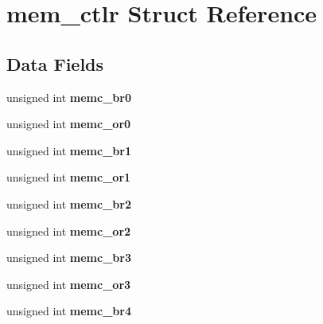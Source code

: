 \hypertarget{structmem__ctlr}{}\section{mem\+\_\+ctlr Struct Reference}
\label{structmem__ctlr}
\subsection*{Data Fields}
\begin{DoxyCompactItemize}
\item 
\mbox{\label{structmem__ctlr_a632d401a3594cf9f50c20b359645c109}} 
unsigned int {\bfseries memc\+\_\+br0}
\item 
\mbox{\label{structmem__ctlr_a0d8b46315f0f758cd84a58789006c712}} 
unsigned int {\bfseries memc\+\_\+or0}
\item 
\mbox{\label{structmem__ctlr_a584eb0437979130b6559e92e9e8a4d64}} 
unsigned int {\bfseries memc\+\_\+br1}
\item 
\mbox{\label{structmem__ctlr_a191699a423fea12218de534495f3adfa}} 
unsigned int {\bfseries memc\+\_\+or1}
\item 
\mbox{\label{structmem__ctlr_aae9760eaa5a09e6ac4102d9959983606}} 
unsigned int {\bfseries memc\+\_\+br2}
\item 
\mbox{\label{structmem__ctlr_a9a31ad7ac05ea63e27434195b1ce63fd}} 
unsigned int {\bfseries memc\+\_\+or2}
\item 
\mbox{\label{structmem__ctlr_ab564c98b86784547f15a61f840ba8df5}} 
unsigned int {\bfseries memc\+\_\+br3}
\item 
\mbox{\label{structmem__ctlr_ade1371c1cccf7a9e4c6c5ec4c585daa4}} 
unsigned int {\bfseries memc\+\_\+or3}
\item 
\mbox{\label{structmem__ctlr_a7ffaf83528eaab3d44a971868c7a277e}} 
unsigned int {\bfseries memc\+\_\+br4}
\item 
\mbox{\label{structmem__ctlr_ac2e49e6e62b205b72218ffd3d53dfc6c}} 

\end{DoxyCompactItemize}
